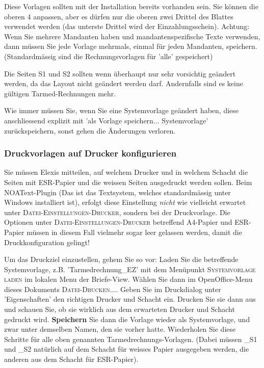 \documentclass[a4paper]{scrartcl}
\begin{document}
\medskip

Diese Vorlagen sollten mit der Installation bereits vorhanden sein. Sie können die oberen 4 anpassen, aber es dürfen nur die oberen zwei Drittel des Blattes verwendet werden (das unterste Drittel wird der Einzahlungsschein). Achtung: Wenn Sie mehrere Mandanten haben und mandantenspezifische Texte verwenden, dann müssen Sie jede Vorlage mehrmals, einmal für jeden Mandanten, speichern. (Standardmässig sind die Rechnungsvorlagen für 'alle' gespeichert)

Die Seiten S1 und S2 sollten wenn überhaupt nur sehr vorsichtig geändert werden, da das Layout nicht geändert werden darf. Andernfalls sind es keine gültigen Tarmed-Rechnungen mehr.

Wie immer müssen Sie, wenn Sie eine Systemvorlage geändert haben, diese anschliessend explizit mit 'als Vorlage speichern... Systemvorlage' zurückspeichern, sonst gehen die Änderungen verloren.

\subsubsection{Druckvorlagen auf Drucker konfigurieren}
Sie müssen Elexis mitteilen, auf welchem Drucker und in welchem Schacht die Seiten mit ESR-Papier und die weissen Seiten ausgedruckt werden sollen. Beim NOAText-Plugin (Das ist das Textsystem, welches standardmässig unter Windows installiert ist), erfolgt diese Einstellung \textit{nicht} wie vielleicht erwartet unter \textsc{Datei-Einstellungen-Drucker}, sondern bei der Druckvorlage. Die Optionen unter \textsc{Datei-Einstellungen-Drucker} betreffend A4-Papier und ESR-Papier müssen in diesem Fall vielmehr sogar leer gelassen werden, damit die Druckkonfiguration gelingt!

\medskip

Um das Druckziel einzustellen, gehem Sie so vor: Laden Sie die betreffende Systemvorlage, z.B. 'Tarmedrechnung\_EZ' mit dem Menüpunkt \textsc{Systemvorlage laden} im lokalen Menu der Briefe-View. Wählen Sie dann im OpenOffice-Menu dieses Dokuments \textsc{Datei-Drucken...}. Geben Sie im Druckdialog unter 'Eigenschaften' den richtigen Drucker und Schacht ein.  Drucken Sie sie dann aus und schauen Sie, ob sie wirklich aus dem erwarteten Drucker und Schacht gedruckt wird. \textbf{Speichern} Sie dann die Vorlage wieder als Systemvorlage, und zwar unter demselben Namen, den sie vorher hatte. Wiederholen Sie diese Schritte für alle oben genannten Tarmedrechnungs-Vorlagen. (Dabei müssen \_S1 und \_S2 natürlich auf dem Schacht für weisses Papier ausgegeben werden, die anderen aus dem Schacht für ESR-Papier).
\end{document}
